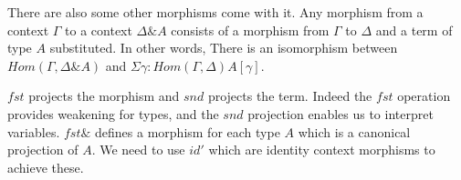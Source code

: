 There are also some other morphisms come with it. Any morphism from a context $\Gamma$ to a context $\Delta \& A$ consists of a morphism from $\Gamma$ to $\Delta$ and a term of type $A$ substituted. In other words, There is an isomorphism between $Hom(\Gamma , \Delta \& A)$ and $\Sigma \gamma : Hom(\Gamma , \Delta) A [ \gamma ] $.

$fst$ projects the morphism and  $snd$ projects the term.
Indeed the $fst$ operation provides weakening for types, and the $snd$ projection enables us to interpret variables. $fst\&$ defines a morphism for each type $A$ which is a canonical projection of $A$.
We need to use $id'$ which are identity context morphisms to achieve these.

\begin{code}\>\<%
\\
%
\\
\> \AgdaSymbol{:} \AgdaSymbol{\{}  \AgdaSymbol{:} \AgdaSymbol{\}(} \AgdaSymbol{:}  \AgdaSymbol{)}    \AgdaSymbol{(} \AgdaFunction{\&} \AgdaSymbol{)}    \<%
\\
\>   \AgdaSymbol{=}  \<[17]%
\>[17]\<%
\\
\>[-6]\<[8]%
\>[8]\AgdaSymbol{\{}  \AgdaSymbol{=}   \AgdaFunction{[}  \AgdaFunction{]fn}\<%
\\
\>[0]\<[8]%
\>[8]\AgdaSymbol{;}  \AgdaSymbol{=}   \AgdaFunction{[}  \AgdaFunction{]resp} \<[35]%
\>[35]\<%
\\
\>[0]\<[8]%
\>[8]\AgdaSymbol{\}}\<%
\\
%
\\
\> \AgdaSymbol{:} \AgdaSymbol{\{} \AgdaSymbol{:} \AgdaSymbol{\}(} \AgdaSymbol{:}  \AgdaSymbol{)}   \AgdaFunction{\&}   \<%
\\
\>  \AgdaSymbol{=}   \<%
\\
%
\\
\> \AgdaSymbol{:} \AgdaSymbol{\{} \AgdaSymbol{:} \AgdaSymbol{\}}     \AgdaSymbol{(} \AgdaSymbol{:}  \AgdaSymbol{)}   \AgdaSymbol{(} \AgdaFunction{\&} \AgdaSymbol{)}\<%

\end{code}
